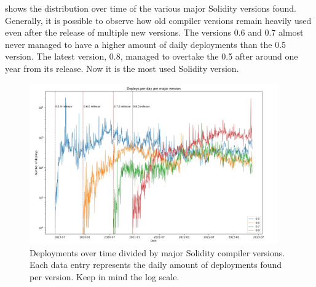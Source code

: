  shows the distribution over time of the various major Solidity versions found. 
Generally, it is possible to observe how old compiler versions remain heavily used even after the release of multiple new versions.
The versions 0.6 and 0.7 almost never managed to have a higher amount of daily deployments than the 0.5 version.
The latest version, 0.8, managed to overtake the 0.5 after around one year from its release. Now it is the most used Solidity version.

\begin{figure}[ht]
    \centering
    \includegraphics[width=0.95\textwidth]{Figures/analysis/deploys_per_day_per_major.jpg}
    \caption{Deployments over time divided by major Solidity compiler versions. Each data entry represents the daily amount of deployments found per version. Keep in mind the log scale.}
    \label{fig:deploys-per-solidity-version}
\end{figure}




